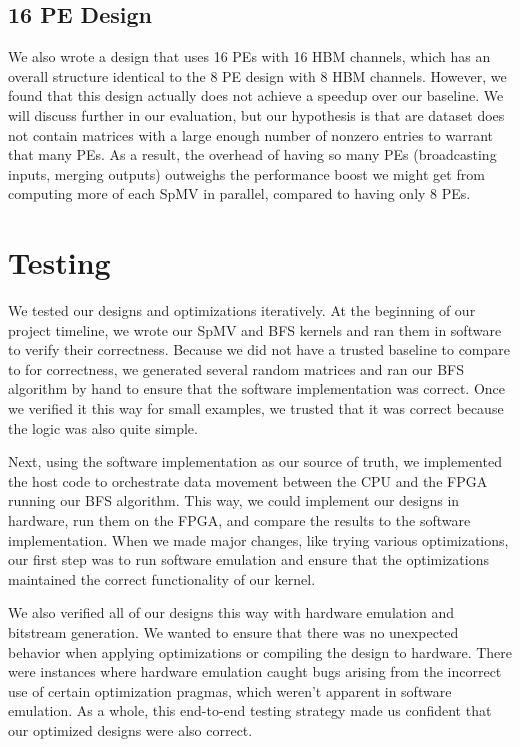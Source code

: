 \documentclass[10pt]{article}
\begin{document}
\subsection{16 PE Design}
\noindent We also wrote a design that uses 16 PEs with 16 HBM channels, which has an overall structure
identical to the 8 PE design with 8 HBM channels. However, we found that this design actually does
not achieve a speedup over our baseline. We will discuss further in our
evaluation, but our hypothesis is that are dataset does not contain matrices
with a large enough number of nonzero entries to warrant that many PEs. As a
result, the overhead of having so many PEs (broadcasting inputs, merging
outputs) outweighs the performance boost we might get from computing more of
each SpMV in parallel, compared to having only 8 PEs.

\section{Testing}
\noindent We tested our designs and optimizations iteratively. At the beginning of our project timeline, we 
wrote our SpMV and BFS kernels and ran them in software to verify their correctness. Because we did not
have a trusted baseline to compare to for correctness, we generated several random matrices and 
ran our BFS algorithm by hand to ensure that the software implementation was correct. Once we verified
it this way for small examples, we trusted that it was correct because the logic was also quite simple. \newline

\noindent Next, using the software implementation as our source of truth, we implemented the host code to orchestrate
data movement between the CPU and the FPGA running our BFS algorithm. This way, we could implement our designs
in hardware, run them on the FPGA, and compare the results to the software implementation. When we made
major changes, like trying various optimizations, our first step was to run software emulation and ensure
that the optimizations maintained the correct functionality of our kernel. \newline 

\noindent We also verified all of our designs this way with hardware emulation and bitstream generation. We wanted
to ensure that there was no unexpected behavior when applying optimizations or compiling the design
to hardware. There were instances where hardware emulation caught bugs arising from the incorrect use
of certain optimization pragmas, which weren't apparent in software emulation. As a whole, this end-to-end
testing strategy made us confident that our optimized designs were also correct. \newline
\end{document}
